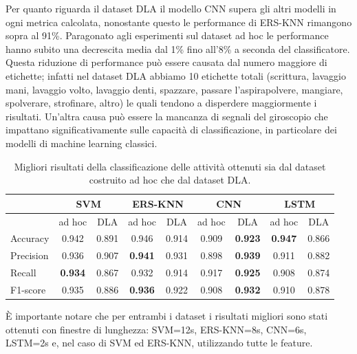 Per quanto riguarda il dataset DLA il modello CNN supera gli altri modelli in ogni metrica calcolata, nonostante questo le performance di ERS-KNN rimangono sopra al 91\%. Paragonato agli esperimenti sul dataset ad hoc le performance hanno subito una decrescita media dal 1\% fino all'8\% a seconda del classificatore. Questa riduzione di performance può essere causata dal numero maggiore di etichette; infatti nel dataset DLA abbiamo 10 etichette totali (scrittura, lavaggio mani, lavaggio volto, lavaggio denti, spazzare, passare l'aspirapolvere, mangiare, spolverare, strofinare, altro) le quali tendono a disperdere maggiormente i risultati. Un'altra causa può essere la mancanza di segnali del giroscopio che impattano significativamente sulle capacità di classificazione, in particolare dei modelli di machine learning classici.

\begin{table}
    \centering
    \begin{tabular}{l | c c | c c | c c | c c }
        \hline
        & \multicolumn{2}{c}{SVM} & \multicolumn{2}{c}{ERS-KNN} & \multicolumn{2}{c}{CNN} & \multicolumn{2}{c}{LSTM} \\
        \hline 
        & ad hoc & DLA & ad hoc & DLA & ad hoc & DLA & ad hoc & DLA \\
        Accuracy & 0.942 & 0.891 & 0.946 & 0.914 & 0.909 & \textbf{0.923} & \textbf{0.947} & 0.866 \\
        Precision & 0.936 & 0.907 & \textbf{0.941} & 0.931 & 0.898 & \textbf{0.939} & 0.911 & 0.882 \\
        Recall & \textbf{0.934} & 0.867 & 0.932 & 0.914 & 0.917 & \textbf{0.925} & 0.908 & 0.874 \\
        F1-score& 0.935 & 0.886 & \textbf{0.936} & 0.922 & 0.908 & \textbf{0.932} & 0.910 & 0.878\\
        \hline
    \end{tabular}
    \caption{Migliori risultati della classificazione delle attività ottenuti sia dal dataset costruito ad hoc che dal dataset DLA.}
    \label{tab:activity-classification}
\end{table}

\`E importante notare che per entrambi i dataset i risultati migliori sono stati ottenuti con finestre di lunghezza: SVM=12s, ERS-KNN=8s, CNN=6s, LSTM=2s e, nel caso di SVM ed ERS-KNN, utilizzando tutte le feature.


